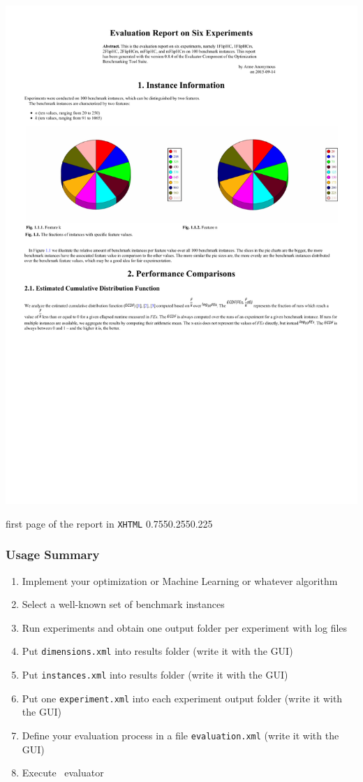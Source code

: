 \begin{frame}[t]
{{{\includegraphics[width=0.215\paperwidth,page=1]{graphics/maxsat_example/maxsat_example_reports/XHTML_report.pdf}%
}\strut\hfill\strut}%
}{%
first page of the report in \texttt{XHTML}%
}{0.755}{0.255}{0.225}%
%
\end{frame}%
%
\begin{frame}%
\frametitle{Usage Summary}%
\begin{enumerate}%
\item Implement your optimization or Machine Learning or whatever algorithm%
\item<2-> Select a well-known set of benchmark instances%
\item<3-> Run experiments and obtain one output folder per experiment with log files\medskip%
\item<4-> Put \texttt{dimensions.xml} into results folder (write it with the GUI)%
\item<5-> Put \texttt{instances.xml} into results folder (write it with the GUI)%
\item<6-> Put one \texttt{experiment.xml} into each experiment output folder (write it with the GUI)%
\item<7-> Define your evaluation process in a file \texttt{evaluation.xml} (write it with the GUI)%
\item<8-> Execute \optimizationBenchmarking\ evaluator%
\end{enumerate}%
\end{frame}%
%